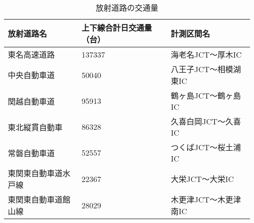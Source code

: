 \begin{table}[h!]
  \centering
  \renewcommand{\arraystretch}{1.2} %
  \begin{tabularx}{\textwidth}{p{}  p{} X}
  \toprule
  \textbf{放射道路名}     &\textbf{上下線合計日交通量（台）}         & \textbf{計測区間名}                         \\
  \midrule
  東名高速道路            &137337                               & 海老名JCT〜厚木IC   \\
  中央自動車道            &50040                                & 八王子JCT〜相模湖東IC \\
  関越自動車道            &95913                                & 鶴ヶ島JCT〜鶴ヶ島IC  \\
  東北縦貫自動車          &86328                                & 久喜白岡JCT〜久喜IC  \\
  常磐自動車道            &52557                                & つくばJCT〜桜土浦IC\\
  東関東自動車道水戸線     &22367                                & 大栄JCT〜大栄IC\\
  東関東自動車道館山線     &28029                                & 木更津JCT〜木更津南IC\\
  \bottomrule
  \end{tabularx}
  \caption{放射道路の交通量}
  \label{radiationroad_number}
  \end{table}
  


